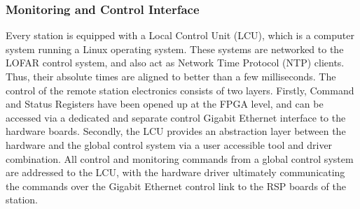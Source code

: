\documentclass{ws-jai}
\begin{document}

\subsubsection {Monitoring and Control  Interface}
 Every station is equipped
with a  Local Control  Unit (LCU), which  is a computer  system running  a Linux
operating system.  These systems are networked  to the LOFAR control system, and
also act as Network Time Protocol  (NTP) clients. Thus, their absolute times are
aligned to  better than a  few milliseconds. The  control of the  remote station
electronics consists of  two layers. Firstly, Command and  Status Registers have
been  opened up  at the  FPGA level,  and can  be accessed  via a  dedicated and
separate control  Gigabit Ethernet interface  to the hardware  boards. Secondly,
the  LCU provides  an  abstraction layer  between the  hardware  and the  global
control system  via a user accessible  tool and driver combination.  All control
and monitoring commands  from a global control system are  addressed to the LCU,
with the hardware driver ultimately  communicating the commands over the Gigabit
Ethernet control link to the RSP boards of the station.


\end{document}
